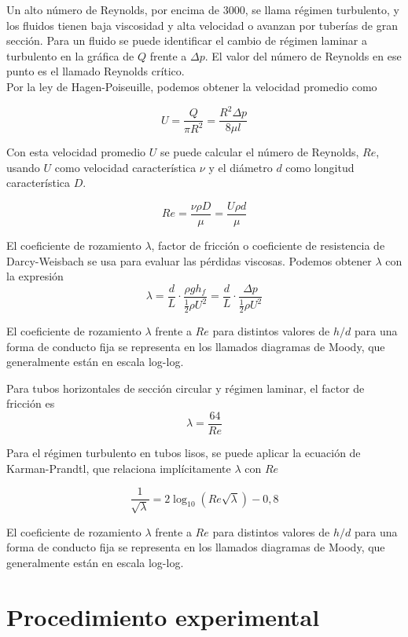 \documentclass[a4paper,12pt,spanish]{article}
\begin{document}
	Un alto número de Reynolds, por encima de 3000, se llama régimen turbulento, y los fluidos tienen baja viscosidad y alta velocidad o avanzan por tuberías de gran sección. Para un fluido se puede identificar el cambio de régimen laminar a turbulento en la gráfica de $Q$ frente a $\mathit{\Delta}p$. El valor del número de Reynolds en ese punto es el llamado Reynolds crítico.\\
	
	
	Por la ley de Hagen-Poiseuille, podemos obtener la velocidad promedio como
	
	\[U = \frac{Q}{\pi R^2} = \frac{R^2 \mathit{\Delta} p}{8\mu l}\]
	
	Con esta velocidad promedio $U$ se puede calcular el número de Reynolds, $Re$, usando $U$ como velocidad característica $\nu$ y el diámetro $d$ como longitud característica $D$.
	
	\[Re = \frac{\nu \rho D}{\mu}= \frac{U \rho d}{\mu}\] 
	
	\vspace{\baselineskip}
	
	El coeficiente de rozamiento $\lambda$, factor de fricción o coeficiente de resistencia de Darcy-Weisbach se usa para evaluar las pérdidas viscosas. Podemos obtener $\lambda$ con la expresión
	\[\lambda = \frac{d}{L} \cdot \frac{\rho g h_f}{\frac{1}{2} \rho U^2} = \frac{d}{L} \cdot \frac{\mathit{\Delta}p}{\frac{1}{2} \rho U^2}\]
	
	
	El coeficiente de rozamiento $\lambda$ frente a $Re$ para distintos valores de $h/d$ para una forma de conducto fija se representa en los llamados diagramas de Moody, que generalmente están en escala log-log.
	
	Para tubos horizontales de sección circular y régimen laminar, el factor de fricción es 
	\[\lambda = \frac{64}{Re}\]
	
	Para el régimen turbulento en tubos lisos, se puede aplicar la ecuación de Karman-Prandtl, que relaciona implícitamente $\lambda$ con $Re$
	
	\[\frac{1}{\sqrt{\lambda}} = 2 \log_{10}(Re\sqrt{\lambda})- 0,8
	\]
	
	El coeficiente de rozamiento $\lambda$ frente a $Re$ para distintos valores de $h/d$ para una forma de conducto fija se representa en los llamados diagramas de Moody, que generalmente están en escala log-log.
	
	
	
	\section{Procedimiento experimental}
	
\end{document}
